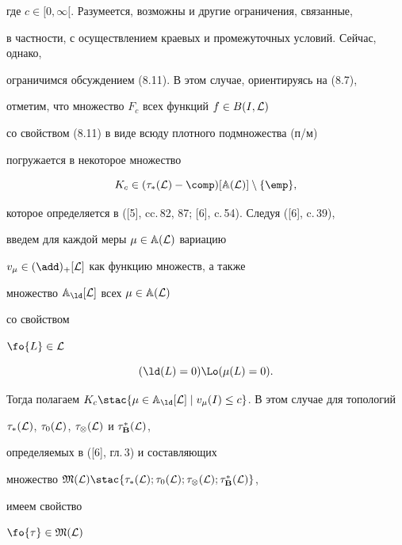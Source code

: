 где $c \in [0,\infty[$. Разумеется, возможны и другие ограничения, связанные,


в частности, с осуществлением краевых и промежуточных условий. Сейчас, однако,


ограничимся обсуждением (8.11). В этом случае, ориентируясь на (8.7),


отметим, что множество $F_c$ всех функций $f \in B(I,{\cal L})$


со свойством (8.11) в виде всюду плотного подмножества (п/м)


погружается в некоторое множество


$$


{K_c} \in ({{\tau}_*}({\cal L}) - {\comp})[{\Bbb A}({\cal L})] \setminus


\{\emp\},


$$


которое определяется в ([5], cc.\,82, 87; [6], c.\,54). Следуя ([6], c.\,39),


введем для каждой меры $\mu \in {{\Bbb A}({\cal L})}$ вариацию


${v_\mu} \in {(\add)_+}[{\cal L}]$ как функцию множеств, а также


множество ${{\Bbb A}_\ld}[{\cal L}]$ всех $\mu \in {{\Bbb A}({\cal L})}$


со свойством


$\fo{L} \in {\cal L}$


\begin{equation}


({{\ld}(L)} = 0) \Lo ({{\mu}(L)} = 0).


\end{equation}


Тогда полагаем ${K_c} \stac \{\mu \in {{\Bbb A}_\ld}[{\cal L}] \mid


{v_\mu}(I) \le c\}$. В этом случае для топологий


${{\tau}_*}({\cal L})$, ${{\tau}_0}({\cal L})$, ${{\tau}_\otimes}({\cal


L})$ и ${{\tau}_{\bold B}^*}({\cal L})$,


определяемых в ([6], гл.\,3) и составляющих


множество ${{\frak M}({\cal L})} \stac \{{{\tau}_*}({\cal L});


{{\tau}_0}({\cal L});{{\tau}_\otimes}({\cal L});


{{\tau}_{\bold B}^*}({\cal L})\}$,


имеем свойство


$\fo{\tau} \in {{\frak M}({\cal L})}$


